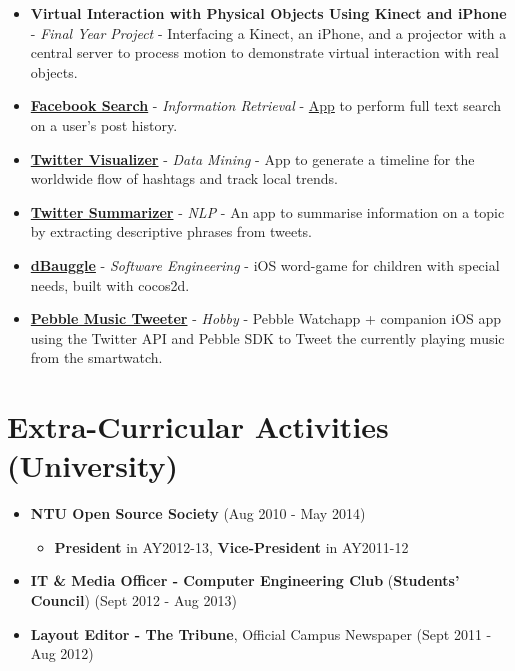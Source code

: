 \begin{itemize}
\item
  \textbf{Virtual Interaction with Physical Objects Using Kinect and
  iPhone} - \emph{Final Year Project} - Interfacing a Kinect, an iPhone,
  and a projector with a central server to process motion to demonstrate
  virtual interaction with real objects.
\item
  \href{https://github.com/arnavk/FacebookSearch}{\textbf{Facebook
  Search}} - \emph{Information Retrieval} -
  \href{http://facebook-search.herokuapp.com/}{App} to perform full text
  search on a user's post history.
\item
  \href{https://github.com/arnavk/Twitter-Visualiser}{\textbf{Twitter
  Visualizer}} - \emph{Data Mining} - App to generate a timeline for the
  worldwide flow of hashtags and track local trends.
\item
  \href{https://github.com/arnavk/NLP}{\textbf{Twitter Summarizer}} -
  \emph{NLP} - An app to summarise information on a topic by extracting
  descriptive phrases from tweets.
\item
  \href{https://itunes.apple.com/us/app/dbauggle!/id625981185?mt=8}{\textbf{dBauggle}}
  - \emph{Software Engineering} - iOS word-game for children with
  special needs, built with cocos2d.
\item
  \href{https://github.com/arnavk/Pebble-MusicTweeter}{\textbf{Pebble
  Music Tweeter}} - \emph{Hobby} - Pebble Watchapp + companion iOS app
  using the Twitter API and Pebble SDK to Tweet the currently playing
  music from the smartwatch.
\end{itemize}

\section{Extra-Curricular Activities
(University)}\label{extra-curricular-activities-university}

\begin{itemize}
\tightlist
\item
  \textbf{NTU Open Source Society} \hfill (Aug 2010 - May 2014)

  \begin{itemize}
  \tightlist
  \item
    \textbf{President} in AY2012-13, \textbf{Vice-President} in
    AY2011-12
  \end{itemize}
\item
  \textbf{IT \& Media Officer - Computer Engineering Club}
  (\textbf{Students' Council}) \hfill (Sept 2012 - Aug 2013)
\item
  \textbf{Layout Editor - The Tribune}, Official Campus Newspaper
  \hfill (Sept 2011 - Aug 2012)
\end{itemize}

